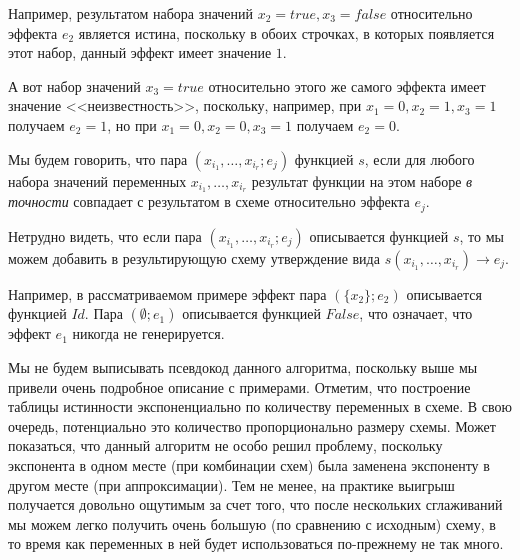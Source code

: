 \begin{framed}
	Например, результатом набора значений $x_2 = true, x_3 = false$ относительно эффекта $e_2$ является истина, поскольку в обоих строчках, в которых появляется этот набор, данный эффект имеет значение $1$.
	
	А вот набор значений $x_3 = true$ относительно этого же самого эффекта имеет значение <<неизвестность>>, поскольку, например, при $x_1 = 0, x_2 = 1, x_3 = 1$ получаем $e_2 = 1$, но при $x_1 = 0, x_2 = 0, x_3 = 1$ получаем $e_2 = 0$.
\end{framed}

Мы будем говорить, что пара $(x_{i_1}, \ldots, x_{i_r}; e_j)$  функцией $s$, если для любого набора значений переменных $x_{i_1}, \ldots, x_{i_r}$ результат функции на этом наборе \emph{в точности} совпадает с результатом в схеме относительно эффекта $e_j$. 

Нетрудно видеть, что если пара $(x_{i_1}, \ldots, x_{i_r}; e_j)$ описывается функцией $s$, то мы можем добавить в результирующую схему утверждение вида $s(x_{i_1}, \ldots, x_{i_r}) \rightarrow e_j$.


\begin{framed}
	Например, в рассматриваемом примере эффект пара $(\{x_2\}; e_2)$ описывается функцией $Id$. Пара $(\emptyset; e_1)$ описывается функцией $False$, что означает, что эффект $e_1$ никогда не генерируется.
\end{framed}

\bigskip

Мы не будем выписывать псевдокод данного алгоритма, поскольку выше мы привели очень подробное описание с примерами. Отметим, что построение таблицы истинности экспоненциально по количеству переменных в схеме. В свою очередь, потенциально это количество пропорционально размеру схемы. Может показаться, что данный алгоритм не особо решил проблему, поскольку экспонента в одном месте (при комбинации схем) была заменена экспоненту в другом месте (при аппроксимации). Тем не менее, на практике выигрыш получается довольно ощутимым за счет того, что после нескольких сглаживаний мы можем легко получить очень большую (по сравнению с исходным) схему, в то время как переменных в ней будет использоваться по-прежнему не так много.